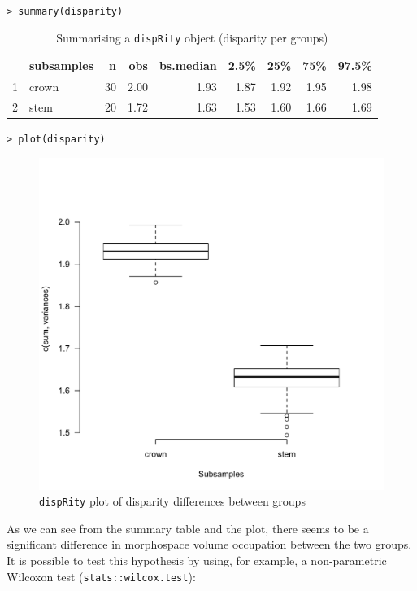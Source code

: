\documentclass[12pt,letterpaper]{article}
\newcommand{\disp}{\texttt{dispRity} }
\begin{document}
\texttt{> summary(disparity)}

\begin{table}[ht]
\centering
\begin{tabular}{rlrrrrrrr}
  \hline
 & subsamples & n & obs & bs.median & 2.5\% & 25\% & 75\% & 97.5\% \\ 
  \hline
1 & crown &  30 & 2.00 & 1.93 & 1.87 & 1.92 & 1.95 & 1.98 \\ 
  2 & stem &  20 & 1.72 & 1.63 & 1.53 & 1.60 & 1.66 & 1.69 \\ 
   \hline
\end{tabular}
\caption{Summarising a \disp object (disparity per groups)}
\label{Tab:summary_group}
\end{table}


\texttt{> plot(disparity)}

\begin{figure}[!htbp]
\centering
   \includegraphics[width=1\textwidth]{plot_example_group.pdf} 
\caption{\disp plot of disparity differences between groups}
\label{Fig:plot_group}
\end{figure}

As we can see from the summary table and the plot, there seems to be a significant difference in morphospace volume occupation between the two groups.
It is possible to test this hypothesis by using, for example, a non-parametric Wilcoxon test (\texttt{stats::wilcox.test}):
\end{document}
